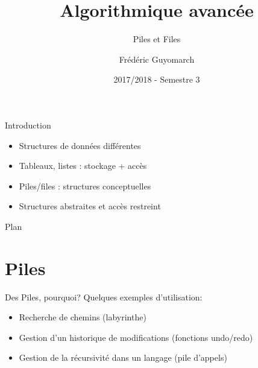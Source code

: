 \documentclass[12pt,a4paper]{beamer}
\title{\textbf{Algorithmique avancée}}
\subtitle{Piles et Files}
\author{Frédéric Guyomarch}
\date{2017/2018 - Semestre 3}
\institute %
{

  Université de Lille1\\
  IUT-A de Lille

}
\begin{document}
\begin{frame}
\titlepage
\end{frame}

\begin{frame}{Introduction}
\begin{itemize}
\item Structures de données différentes
\item Tableaux, listes : stockage + accès 
\item Piles/files : structures conceptuelles
\item Structures abstraites et accès restreint
\end{itemize}




\end{frame}

\begin{frame}{Plan}
\tableofcontents
\end{frame}

\section{Piles}

\begin{frame}{Des Piles, pourquoi?}
Quelques exemples d'utilisation:
\begin{itemize}
\item Recherche de chemins (labyrinthe) 
\item Gestion d'un historique de modifications (fonctions undo/redo)
\item Gestion de la récursivité dans un langage (pile d'appels)
\end{itemize}

\end{frame}
\end{document}
